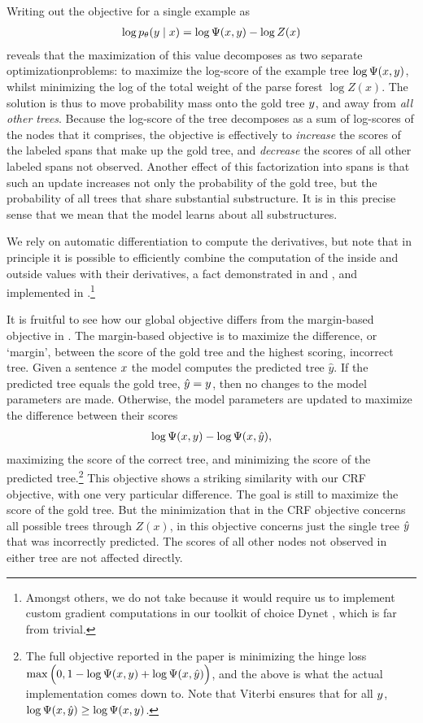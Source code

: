     Writing out the objective for a single example as
    \begin{align*}
      \log p_{\theta}(y \mid x) = \log \Psi(x, y) - \log Z(x)
    \end{align*}
    reveals that the maximization of this value decomposes as two separate optimizationproblems: to maximize the log-score of the example tree $\log \Psi(x, y)$, whilst minimizing the log of the total weight of the parse forest $\log Z(x)$. The solution is thus to move probability mass onto the gold tree $y$, and away from \textit{all other trees}. Because the log-score of the tree decomposes as a sum of log-scores of the nodes that it comprises, the objective is effectively to \textit{increase} the scores of the labeled spans that make up the gold tree, and \textit{decrease} the scores of all other labeled spans not observed. Another effect of this factorization into spans is that such an update increases not only the probability of the gold tree, but the probability of all trees that share substantial substructure. It is in this precise sense that we mean that the model learns about all substructures.

    We rely on automatic differentiation to compute the derivatives, but note that in principle it is possible to efficiently combine the computation of the inside and outside values with their derivatives, a fact demonstrated in \citep{eisner2009semirings} and \citep{eisner2016backprop}, and implemented in \citep{kim2017structured}.\footnote{Amongst others, we do not take because it would require us to implement custom gradient computations in our toolkit of choice Dynet \cite{neubig2017dynet}, which is far from trivial.}

    It is fruitful to see how our global objective differs from the margin-based objective in \citep{stern2017minimal}. The margin-based objective is to maximize the difference, or `margin', between the score of the gold tree and the highest scoring, incorrect tree. Given a sentence $x$ the model computes the predicted tree $\hat{y}$. If the predicted tree equals the gold tree, $\hat{y} = y$, then no changes to the model parameters are made. Otherwise, the model parameters are updated to maximize the difference between their scores
    \begin{align*}
      \log \Psi(x, y) - \log \Psi(x, \hat{y}),
    \end{align*}
    maximizing the score of the correct tree, and minimizing the score of the predicted tree.\footnote{The full objective reported in the paper is minimizing the hinge loss $\max \Big(0, 1 - \log \Psi(x, y) + \log \Psi(x, \hat{y}) \Big)$, and the above is what the actual implementation comes down to. Note that Viterbi ensures that for all $y$, $\log \Psi(x, \hat{y}) \geq \log \Psi(x, y)$.} This objective shows a striking similarity with our CRF objective, with one very particular difference. The goal is still to maximize the score of the gold tree. But the minimization that in the CRF objective concerns all possible trees through $Z(x)$, in this objective concerns just the single tree $\hat{y}$ that was incorrectly predicted. The scores of all other nodes not observed in either tree are not affected directly.


